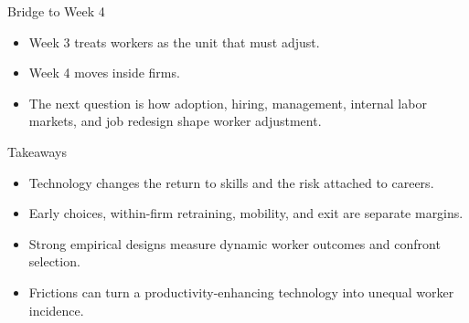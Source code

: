 \documentclass[aspectratio=169,11pt]{beamer}
\begin{document}
\begin{frame}{Bridge to Week 4}
\begin{itemize}
    \item Week 3 treats workers as the unit that must adjust.
    \item Week 4 moves inside firms.
    \item The next question is how adoption, hiring, management, internal labor markets, and job redesign shape worker adjustment.
\end{itemize}
\end{frame}

\begin{frame}{Takeaways}
\begin{itemize}
    \item Technology changes the return to skills and the risk attached to careers.
    \item Early choices, within-firm retraining, mobility, and exit are separate margins.
    \item Strong empirical designs measure dynamic worker outcomes and confront selection.
    \item Frictions can turn a productivity-enhancing technology into unequal worker incidence.
\end{itemize}
\end{frame}
\end{document}
